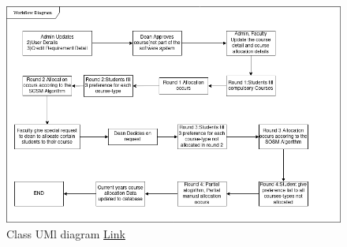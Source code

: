 \documentclass[conference]{IEEEtran}
\begin{document}
\begin{figure}[htbp]
    \centering
    \includegraphics[width=\linewidth]{WF.png}
    \caption{Class UMl diagram \href{https://github.com/LokeshVenkatachalam/CODEFORCES/blob/main/Untitled2drawio.drawio.png}{Link}}
    \label{fig}
\end{figure}
\end{document}

